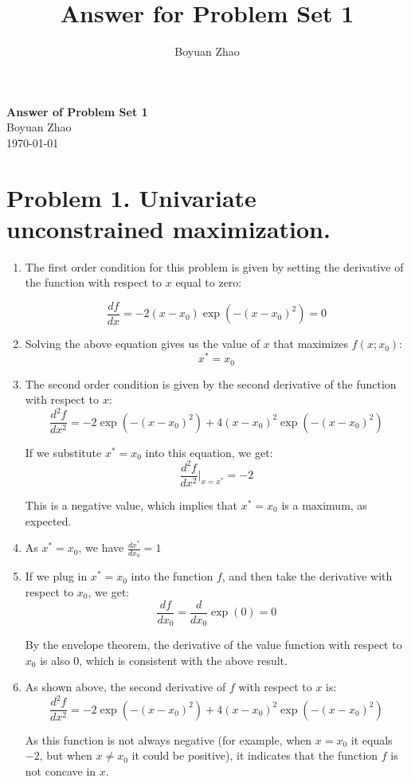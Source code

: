 \documentclass[UTF8,titlepage]{article}
\title{Answer for Problem Set 1}
\author{Boyuan Zhao}
\numberwithin{figure}{section}
\begin{document}
\begin{center}
    {\LARGE \textbf{Answer of Problem Set 1}}\\  %
    {\normalsize Boyuan Zhao}\\  %
    {\small \today}  %
\end{center}

\section{Problem 1. Univariate unconstrained maximization.}
\begin{enumerate}
    \item The first order condition for this problem is given by setting the derivative of the function with respect to $x$ equal to zero:

    \[\frac{df}{dx} = -2(x - x_0) \exp(-(x - x_0)^2) = 0\]

    \item Solving the above equation gives us the value of $x$ that maximizes $f(x; x_0)$:
    \[x^* = x_0\]

    \item The second order condition is given by the second derivative of the function with respect to $x$:
    \[\frac{d^2f}{dx^2} = -2 \exp(-(x - x_0)^2) + 4(x - x_0)^2 \exp(-(x - x_0)^2)\]

    If we substitute $x^* = x_0$ into this equation, we get:
    \[\frac{d^2f}{dx^2}\Big|_{x=x^*} = -2\]

    This is a negative value, which implies that $x^* = x_0$ is a maximum, as expected.

    \item As $x^* = x_0$, we have $\frac{dx^*}{dx_0} = 1$
    
    \item If we plug in $x^* = x_0$ into the function $f$, and then take the derivative with respect to $x_0$, we get:
    \[\frac{df}{dx_0} = \frac{d}{dx_0}\exp(0) = 0\]

    By the envelope theorem, the derivative of the value function with respect to $x_0$ is also 0, which is consistent with the above result.

    \item As shown above, the second derivative of $f$ with respect to $x$ is:
    \[\frac{d^2f}{dx^2} = -2 \exp(-(x - x_0)^2) + 4(x - x_0)^2 \exp(-(x - x_0)^2)\]
    
    As this function is not always negative (for example, when $x = x_0$ it equals $-2$, but when $x \neq x_0$ it could be positive), it indicates that the function $f$ is not concave in $x$.
\end{enumerate}
\end{document}
